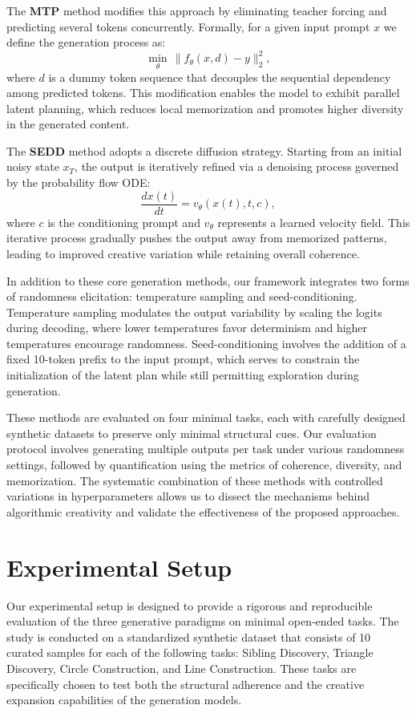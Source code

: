 \documentclass[12pt]{article}
\begin{document}
The \textbf{MTP} method modifies this approach by eliminating teacher forcing and predicting several tokens concurrently. Formally, for a given input prompt \( x \) we define the generation process as:
\[
\min_{\theta} \, \| f_\theta(x, d) - y \|_2^2,
\]
where \( d \) is a dummy token sequence that decouples the sequential dependency among predicted tokens. This modification enables the model to exhibit parallel latent planning, which reduces local memorization and promotes higher diversity in the generated content.

The \textbf{SEDD} method adopts a discrete diffusion strategy. Starting from an initial noisy state \( x_T \), the output is iteratively refined via a denoising process governed by the probability flow ODE:
\[
\frac{dx(t)}{dt} = v_\theta(x(t), t, c),
\]
where \( c \) is the conditioning prompt and \( v_\theta \) represents a learned velocity field. This iterative process gradually pushes the output away from memorized patterns, leading to improved creative variation while retaining overall coherence.

In addition to these core generation methods, our framework integrates two forms of randomness elicitation: temperature sampling and seed-conditioning. Temperature sampling modulates the output variability by scaling the logits during decoding, where lower temperatures favor determinism and higher temperatures encourage randomness. Seed-conditioning involves the addition of a fixed 10-token prefix to the input prompt, which serves to constrain the initialization of the latent plan while still permitting exploration during generation.

These methods are evaluated on four minimal tasks, each with carefully designed synthetic datasets to preserve only minimal structural cues. Our evaluation protocol involves generating multiple outputs per task under various randomness settings, followed by quantification using the metrics of coherence, diversity, and memorization. The systematic combination of these methods with controlled variations in hyperparameters allows us to dissect the mechanisms behind algorithmic creativity and validate the effectiveness of the proposed approaches.

\section{Experimental Setup}
Our experimental setup is designed to provide a rigorous and reproducible evaluation of the three generative paradigms on minimal open‐ended tasks. The study is conducted on a standardized synthetic dataset that consists of 10 curated samples for each of the following tasks: Sibling Discovery, Triangle Discovery, Circle Construction, and Line Construction. These tasks are specifically chosen to test both the structural adherence and the creative expansion capabilities of the generation models.
\end{document}
